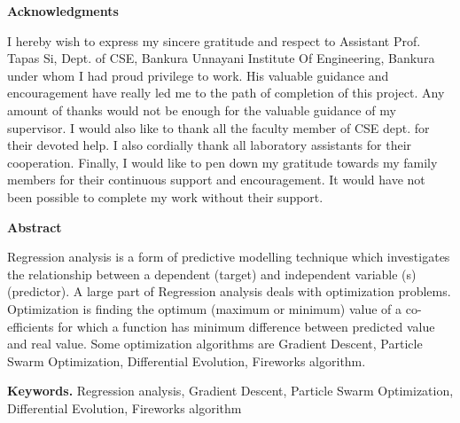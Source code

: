 \documentclass[11pt, a4paper]{report}
\newcommand{\SupervisorName}{Tapas Si}
\begin{document}
\begin{center}
        \vspace*{1cm}
         \LARGE
        \textbf{Acknowledgments}
        
        \vspace{1.5cm}
 \justify      
		I hereby wish to express my sincere gratitude and respect to Assistant Prof. \SupervisorName, Dept. of CSE, Bankura Unnayani Institute Of Engineering, Bankura under whom I had proud privilege to work. His valuable guidance and encouragement have really led me to the path of completion of this project. Any amount of thanks would not be enough for the valuable guidance of my supervisor. 
I would also like to thank all the faculty member of CSE dept. for their devoted help. I also cordially thank all laboratory assistants for their cooperation.
Finally, I would like to pen down my gratitude towards my family members for their continuous support and encouragement. It would have not been possible to complete my work without their support.
   
        
     
        
        \vfill
        
       
        
        
        
    \end{center}
    


\newpage
\vspace*{1cm}
\begin{center}
\LARGE
\textbf{Abstract}
\end{center}

\justify
Regression analysis is a form of predictive modelling technique which investigates the relationship between a dependent (target) and independent variable (s) (predictor). A large part of Regression analysis deals with optimization problems. Optimization is finding the optimum (maximum or minimum) value of a co-efficients for which a function has minimum difference between predicted value and real value. Some optimization algorithms are Gradient Descent, Particle Swarm Optimization, Differential Evolution, Fireworks algorithm.

 
 \vspace*{1cm}
 \smallskip
\noindent \textbf{Keywords.} Regression analysis, Gradient Descent, Particle Swarm Optimization, Differential Evolution, Fireworks algorithm

 

\newpage
\tableofcontents
\end{document}
